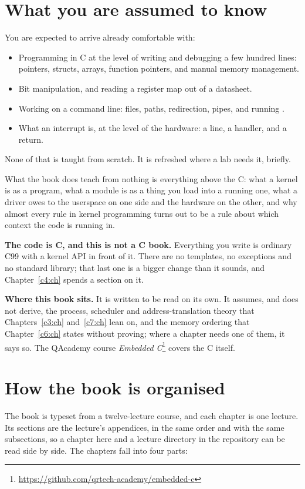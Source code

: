 \section*{What you are assumed to know}
You are expected to arrive already comfortable with:
\begin{itemize}
  \item Programming in C at the level of writing and debugging a few hundred lines: pointers,
    structs, arrays, function pointers, and manual memory management.
  \item Bit manipulation, and reading a register map out of a datasheet.
  \item Working on a command line: files, paths, redirection, pipes, and running .
  \item What an interrupt is, at the level of the hardware: a line, a handler, and a return.
\end{itemize}
None of that is taught from scratch. It is refreshed where a lab needs it, briefly.

What the book does teach from nothing is everything above the C: what a kernel is as a program,
what a module is as a thing you load into a running one, what a driver owes to the userspace on one
side and the hardware on the other, and why almost every rule in kernel programming turns out to be
a rule about which context the code is running in.

\textbf{The code is C, and this is not a C book.} Everything you write is ordinary C99 with a kernel
API in front of it. There are no templates, no exceptions and no standard library; that last one is
a bigger change than it sounds, and Chapter~\ref{c4:ch} spends a section on it.

\textbf{Where this book sits.} It is written to be read on its own. It assumes, and does not
derive, the process, scheduler and address-translation theory that Chapters~\ref{c3:ch}
and~\ref{c7:ch} lean on, and the memory ordering that Chapter~\ref{c6:ch} states without proving;
where a chapter needs one of them, it says so. The QAcademy course
\emph{Embedded C}\footnote{\url{https://github.com/qrtech-academy/embedded-c}} covers the C itself.

\section*{How the book is organised}
The book is typeset from a twelve-lecture course, and each chapter is one lecture. Its sections are
the lecture's appendices, in the same order and with the same subsections, so a chapter here and a
lecture directory in the repository can be read side by side. The chapters fall into four parts:

